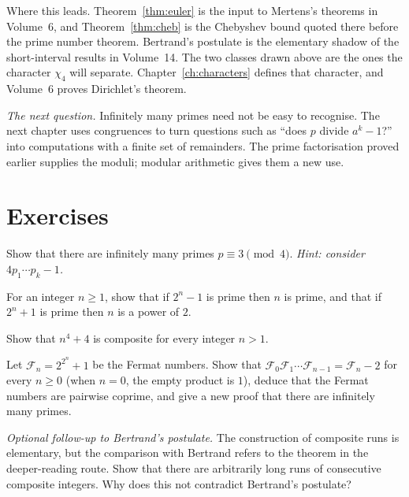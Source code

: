 \begin{beauty}
Where this leads. Theorem~\ref{thm:euler} is the input to Mertens's theorems in Volume~6, and Theorem~\ref{thm:cheb} is the Chebyshev bound quoted there before the prime number theorem. Bertrand's postulate is the elementary shadow of the short-interval results in Volume~14. The two classes drawn above are the ones the character $\chi_4$ will separate. Chapter~\ref{ch:characters} defines that character, and Volume~6 proves Dirichlet's theorem.
\end{beauty}

\medskip
\noindent\emph{The next question.} Infinitely many primes need not be easy to recognise. The next chapter uses congruences to turn questions such as ``does $p$ divide $a^k-1$?'' into computations with a finite set of remainders. The prime factorisation proved earlier supplies the moduli; modular arithmetic gives them a new use.

\section{Exercises}

\begin{exercise}[$\star$]\label{ex:mod4}
Show that there are infinitely many primes $p\equiv3\pmod4$. \emph{Hint: consider $4p_1\cdots p_k-1$.}
\end{exercise}

\begin{exercise}[$\star$]\label{ex:mersenne}
For an integer $n\ge1$, show that if $2^n-1$ is prime then $n$ is prime, and that if $2^n+1$ is prime then $n$ is a power of $2$.
\end{exercise}

\begin{exercise}[$\star$]\label{ex:germain}
Show that $n^4+4$ is composite for every integer $n>1$.
\end{exercise}

\begin{exercise}[$\star\star$]\label{ex:fermatnum}
Let $\mathcal F_n=2^{2^n}+1$ be the Fermat numbers. Show that $\mathcal F_0\mathcal F_1\cdots\mathcal F_{n-1}=\mathcal F_n-2$ for every $n\ge0$ (when $n=0$, the empty product is $1$), deduce that the Fermat numbers are pairwise coprime, and give a new proof that there are infinitely many primes.
\end{exercise}

\begin{exercise}[$\star\star$]\label{ex:gaps}
\emph{Optional follow-up to Bertrand's postulate.} The construction of
composite runs is elementary, but the comparison with Bertrand refers
to the theorem in the deeper-reading route.
Show that there are arbitrarily long runs of consecutive composite integers. Why does this not contradict Bertrand's postulate?
\end{exercise}

